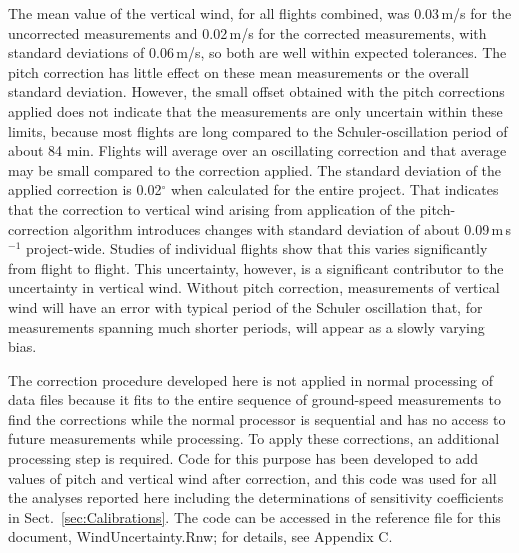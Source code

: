 \documentclass[12pt,twoside,english]{article}\usepackage[]{graphicx}\usepackage[]{color}
\let\OrgIndex\index
\renewcommand*{\index}[1]{\OrgIndex{#1}}
\begin{document}
The mean value of the vertical wind, for all flights combined, was 
0.03\,m/s for the uncorrected measurements and 0.02\,m/s for the corrected measurements, with standard deviations of  
0.06\,m/s,  so both are well within expected tolerances. The pitch correction has little effect on these mean measurements or the overall standard deviation.  However, the small offset obtained with the pitch corrections applied does not indicate that the measurements are only uncertain within these limits, because most flights are long compared to the Schuler-oscillation period of about 84 min. Flights will average over an oscillating correction and that average may be small compared to the correction applied. The standard deviation of the applied correction is 0.02$^{\circ}$ when calculated for the entire project. That indicates that the correction to vertical wind arising from application of the pitch-correction algorithm introduces changes with standard deviation of about 
0.09\,m\,s$^{-1}$  project-wide. Studies of individual flights  show that this varies significantly from flight to flight. This uncertainty, however, is a significant contributor to the uncertainty in vertical wind.  Without pitch correction, measurements of vertical wind  will have an error with typical period of the Schuler oscillation that, for measurements spanning much shorter periods, will appear as a slowly varying bias. 

The correction procedure developed here is not applied in normal processing of data files because it fits to the entire sequence of ground-speed measurements to find the corrections while the normal processor is sequential and has no access to future measurements while processing. To apply these corrections, an additional processing step is required. Code for this purpose has been developed to add values of pitch and vertical wind after correction, and this code was used for all the analyses reported here including the determinations of sensitivity coefficients in Sect.~\ref{sec:Calibrations}. The code can be accessed in the reference file for this document, WindUncertainty.Rnw; for details, see Appendix C.

% 
\end{document}
